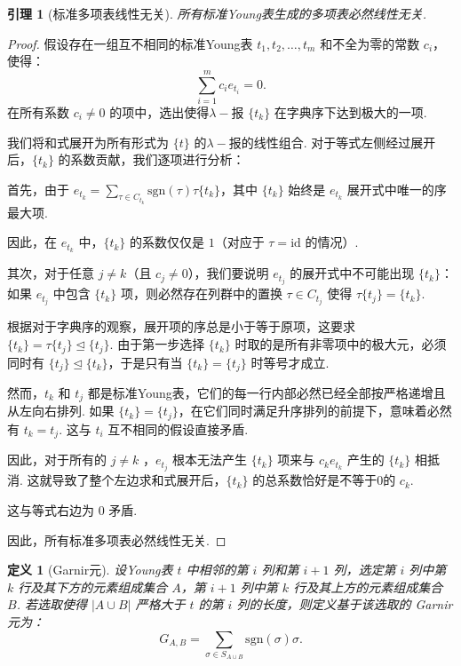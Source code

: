 \documentclass{sjtureport}
\newtheorem{lemma}[theorem]{引理}
\newtheorem{definition}{定义}[chapter]
\begin{document}
\begin{lemma}[标准多项表线性无关]
    所有标准Young表生成的多项表必然线性无关.
\end{lemma}
\begin{proof}
    假设存在一组互不相同的标准Young表 $t_1, t_2, \dots, t_m$ 和不全为零的常数 $c_i$，使得：
    \begin{equation*}
        \sum_{i=1}^m c_i e_{t_i} = 0.
    \end{equation*}
    在所有系数 $c_i \neq 0$ 的项中，选出使得$\lambda-\!$报 $\{t_k\}$ 在字典序下达到极大的一项.\par
    我们将和式展开为所有形式为 $\{t\}$ 的$\lambda-\!$报的线性组合. 对于等式左侧经过展开后，$\{t_k\}$ 的系数贡献，我们逐项进行分析：\par
    首先，由于 $e_{t_k} = \sum_{\tau \in C_{t_k}} \mathrm{sgn}(\tau)\tau \{t_k\}$，其中 $\{t_k\}$ 始终是 $e_{t_k}$ 展开式中唯一的序最大项.\par
    因此，在 $e_{t_k}$ 中，$\{t_k\}$ 的系数仅仅是 $1$（对应于 $\tau = \mathrm{id}$ 的情况）.\par
    其次，对于任意 $j \neq k$（且 $c_j \neq 0$），我们要说明 $e_{t_j}$ 的展开式中不可能出现 $\{t_k\}$：如果 $e_{t_j}$ 中包含 $\{t_k\}$ 项，则必然存在列群中的置换 $\tau \in C_{t_j}$ 使得 $\tau \{t_j\} = \{t_k\}$. \par
    根据对于字典序的观察，展开项的序总是小于等于原项，这要求 $\{t_k\} = \tau \{t_j\} \unlhd \{t_j\}$. 由于第一步选择 $\{t_k\}$ 时取的是所有非零项中的极大元，必须同时有 $\{t_j\} \unlhd \{t_k\}$，于是只有当 $\{t_k\} = \{t_j\}$ 时等号才成立.\par
    然而，$t_k$ 和 $t_j$ 都是标准Young表，它们的每一行内部必然已经全部按严格递增且从左向右排列. 如果 $\{t_k\} = \{t_j\}$，在它们同时满足升序排列的前提下，意味着必然有 $t_k = t_j$. 这与 $t_i$ 互不相同的假设直接矛盾.\par
    因此，对于所有的 $j \neq k$ ，$e_{t_j}$ 根本无法产生 $\{t_k\}$ 项来与 $c_k e_{t_k}$ 产生的 $\{t_k\}$ 相抵消. 这就导致了整个左边求和式展开后，$\{t_k\}$ 的总系数恰好是不等于0的 $c_k$.\par
    这与等式右边为 $0$ 矛盾.\par
    因此，所有标准多项表必然线性无关.
\end{proof}

\begin{definition}[Garnir元]
    设Young表 $t$ 中相邻的第 $i$ 列和第 $i+1$ 列，选定第 $i$ 列中第 $k$ 行及其下方的元素组成集合 $A$，第 $i+1$ 列中第 $k$ 行及其上方的元素组成集合 $B$. 若选取使得 $|A \cup B|$ 严格大于 $t$ 的第 $i$ 列的长度，则定义基于该选取的 Garnir 元为：
    \begin{equation*}
        G_{A,B} = \sum_{\sigma \in S_{A \cup B}} \mathrm{sgn}(\sigma) \sigma.
    \end{equation*}
\end{definition}
\end{document}
